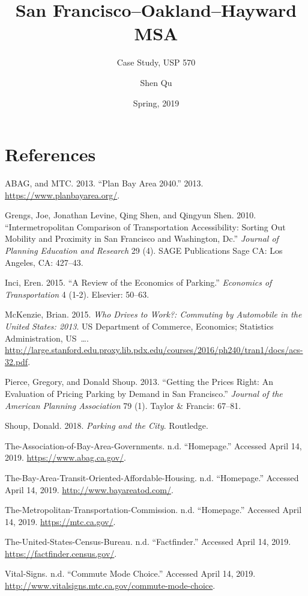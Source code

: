 \documentclass[12pt,]{article}
\title{San Francisco--Oakland--Hayward MSA}
\subtitle{Case Study, USP 570}
\author{Shen Qu}
\date{Spring, 2019}
\begin{document}
\maketitle

\hypertarget{references}{%
\section*{References}\label{references}}

\hypertarget{refs}{}
\leavevmode\hypertarget{ref-ABAG2013plan}{}%
ABAG, and MTC. 2013. ``Plan Bay Area 2040.'' 2013.
\url{https://www.planbayarea.org/}.

\leavevmode\hypertarget{ref-grengs2010intermetropolitan}{}%
Grengs, Joe, Jonathan Levine, Qing Shen, and Qingyun Shen. 2010.
``Intermetropolitan Comparison of Transportation Accessibility: Sorting
Out Mobility and Proximity in San Francisco and Washington, Dc.''
\emph{Journal of Planning Education and Research} 29 (4). SAGE
Publications Sage CA: Los Angeles, CA: 427--43.

\leavevmode\hypertarget{ref-inci2015review}{}%
Inci, Eren. 2015. ``A Review of the Economics of Parking.''
\emph{Economics of Transportation} 4 (1-2). Elsevier: 50--63.

\leavevmode\hypertarget{ref-mckenzie2015drives}{}%
McKenzie, Brian. 2015. \emph{Who Drives to Work?: Commuting by
Automobile in the United States: 2013}. US Department of Commerce,
Economics; Statistics Administration, US~\ldots{}.
\url{http://large.stanford.edu.proxy.lib.pdx.edu/courses/2016/ph240/tran1/docs/acs-32.pdf}.

\leavevmode\hypertarget{ref-pierce2013getting}{}%
Pierce, Gregory, and Donald Shoup. 2013. ``Getting the Prices Right: An
Evaluation of Pricing Parking by Demand in San Francisco.''
\emph{Journal of the American Planning Association} 79 (1). Taylor \&
Francis: 67--81.

\leavevmode\hypertarget{ref-shoup2018parking}{}%
Shoup, Donald. 2018. \emph{Parking and the City}. Routledge.

\leavevmode\hypertarget{ref-ABAG}{}%
The-Association-of-Bay-Area-Governments. n.d. ``Homepage.'' Accessed
April 14, 2019. \url{https://www.abag.ca.gov/}.

\leavevmode\hypertarget{ref-TOAH}{}%
The-Bay-Area-Transit-Oriented-Affordable-Housing. n.d. ``Homepage.''
Accessed April 14, 2019. \url{http://www.bayareatod.com/}.

\leavevmode\hypertarget{ref-MTC}{}%
The-Metropolitan-Transportation-Commission. n.d. ``Homepage.'' Accessed
April 14, 2019. \url{https://mtc.ca.gov/}.

\leavevmode\hypertarget{ref-USCB}{}%
The-United-States-Census-Bureau. n.d. ``Factfinder.'' Accessed April 14,
2019. \url{https://factfinder.census.gov/}.

\leavevmode\hypertarget{ref-CMC}{}%
Vital-Signs. n.d. ``Commute Mode Choice.'' Accessed April 14, 2019.
\url{http://www.vitalsigns.mtc.ca.gov/commute-mode-choice}.
\end{document}
